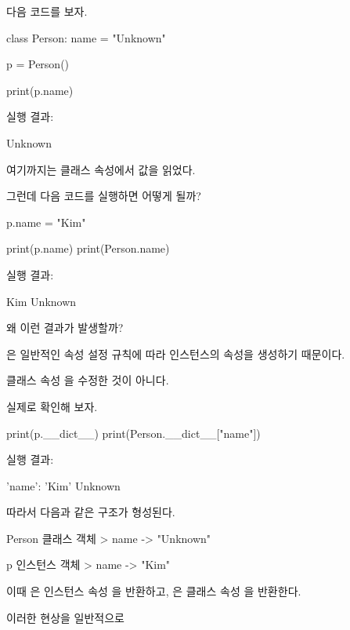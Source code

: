 다음 코드를 보자.

\begin{dhkcode}
class Person:
    name = "Unknown"

p = Person()

print(p.name)
\end{dhkcode}

실행 결과:

\begin{dhkzsh}
Unknown
\end{dhkzsh}

여기까지는 클래스 속성에서 값을 읽었다.

그런데 다음 코드를 실행하면 어떻게 될까?

\begin{dhkcode}
p.name = "Kim"

print(p.name)
print(Person.name)
\end{dhkcode}

실행 결과:

\begin{dhkzsh}
Kim
Unknown
\end{dhkzsh}

왜 이런 결과가 발생할까?

은 일반적인 속성 설정 규칙에 따라 인스턴스의  속성을 생성하기 때문이다.

클래스 속성 을 수정한 것이 아니다.

실제로 확인해 보자.

\begin{dhkcode}
print(p.__dict__)
print(Person.__dict__["name"])
\end{dhkcode}

실행 결과:

\begin{dhkzsh}
{'name': 'Kim'}
Unknown
\end{dhkzsh}

따라서 다음과 같은 구조가 형성된다.

\begin{dhkdir}[in=6]
Person 클래스 객체
> name -> "Unknown"
\end{dhkdir}

\begin{dhkdir}[in=6]
p 인스턴스 객체
> name -> "Kim"
\end{dhkdir}

이때 은 인스턴스 속성 을 반환하고, 은 클래스 속성 을 반환한다.

이러한 현상을 일반적으로 

